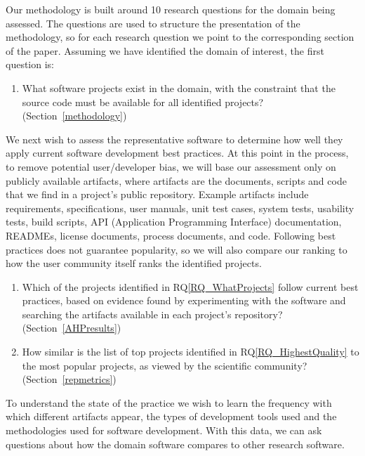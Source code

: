 \documentclass[runningheads]{llncs}
\newcounter{rqnum} %
\newcommand{\rqref}[1]{RQ\ref{#1}}
\begin{document}
Our methodology is built around 10 research questions for the domain being
assessed.  The questions are used to structure the presentation of the
methodology, so for each research question we point to the corresponding section
of the paper.  Assuming we have identified the domain of interest, the first question is:

\begin{enumerate}
	\item[RQ\refstepcounter{rqnum}\therqnum \label{RQ_WhatProjects}:] What
	software projects exist in the domain, with the constraint that the source
	code must be available for all identified projects?
	(Section~\ref{methodology})
\end{enumerate}

We next wish to assess the representative software to determine how well they
apply current software development best practices.  At this point in the
process, to remove potential user/developer bias, we will base our assessment
only on publicly available artifacts, where artifacts are the documents, scripts
and code that we find in a project's public repository. Example artifacts
include requirements, specifications, user manuals, unit test cases, system
tests, usability tests, build scripts, API (Application Programming Interface)
documentation, READMEs, license documents, process documents, and code.
Following best practices does not guarantee popularity, so we will also compare
our ranking to how the user community itself ranks the identified projects.

\begin{enumerate}
	\item [RQ\refstepcounter{rqnum}\therqnum \label{RQ_HighestQuality}:] Which
	of the projects identified in \rqref{RQ_WhatProjects} follow current best
	practices, based on evidence found by experimenting with the software and
	searching the artifacts available in each project's repository? (Section~\ref{AHPresults})
	\item [RQ\refstepcounter{rqnum}\therqnum \label{RQ_CompareHQ2Popular}:] How
	similar is the list of top projects identified in \rqref{RQ_HighestQuality}
	to the most popular projects, as viewed by the scientific community? (Section~\ref{repmetrics})
\end{enumerate}

To understand the state of the practice we wish to learn the frequency with
which different artifacts appear, the types of development tools used and the
methodologies used for software development.  With this data, we can ask
questions about how the domain software compares to other research software.
\end{document}
